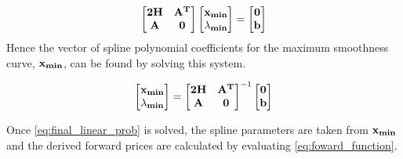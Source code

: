 \documentclass{article}
\begin{document}
\begin{equation}
    \begin{bmatrix}
        \mathbf{2H} & \mathbf{A^T} \\
        \mathbf{A} & \mathbf{0}
    \end{bmatrix}
    \begin{bmatrix}
        \mathbf{x_{min}} \\
        \mathbf{\lambda_{min}}
    \end{bmatrix} = 
    \begin{bmatrix}
        \mathbf{0} \\
        \mathbf{b}
    \end{bmatrix}
\end{equation}
Hence the vector of spline polynomial coefficients for the maximum smoothness curve, $\mathbf{x_{min}}$,
can be found by solving this system.

\begin{equation}
    \label{eq:final_linear_prob}
    \begin{bmatrix}
        \mathbf{x_{min}} \\
        \mathbf{\lambda_{min}}
    \end{bmatrix} = 
    \begin{bmatrix}
        \mathbf{2H} & \mathbf{A^T} \\
        \mathbf{A} & \mathbf{0}
    \end{bmatrix}^{-1}
    \begin{bmatrix}
        \mathbf{0} \\
        \mathbf{b}
    \end{bmatrix}
\end{equation}

Once \ref{eq:final_linear_prob} is solved, the spline parameters are taken from $\mathbf{x_{min}}$
and the derived forward prices are calculated by evaluating \ref{eq:foward_function}.
\end{document}
